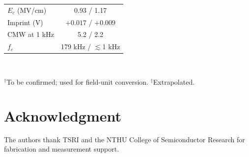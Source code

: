 \documentclass[journal]{IEEEtran}
\newcommand{\fc}{f_{c}}
\begin{document}
\begin{table}[!t]
\begin{tabular}{@{}lcc@{}}
$E_c$ (MV/cm)                   & \multicolumn{2}{c}{0.93 / 1.17} \\
Imprint (V)                     & \multicolumn{2}{c}{$+0.017$ / $+0.009$} \\
CMW at 1 kHz                    & \multicolumn{2}{c}{5.2 / 2.2} \\
$\fc$                           & \multicolumn{2}{c}{179 kHz / $\lesssim$1 kHz} \\
\bottomrule
\end{tabular}
\\[2pt]
\raggedright\scriptsize $^{\dagger}$To be confirmed; used for field-unit
conversion. $^{\ddagger}$Extrapolated.
\end{table}

\section*{Acknowledgment}
The authors thank TSRI and the NTHU College of Semiconductor Research for
fabrication and measurement support.
\end{document}

